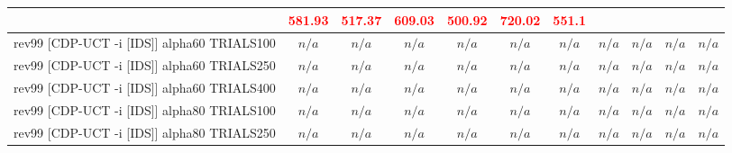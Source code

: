 \documentclass{article}
\begin{document}
\begin{tabular}{|l|r@{$\pm$}rr@{$\pm$}rr@{$\pm$}rr@{$\pm$}rr@{$\pm$}rr@{$\pm$}rr@{$\pm$}rr@{$\pm$}rr@{$\pm$}rr@{$\pm$}r|}
& \multicolumn{2}{c}{\textbf{\textcolor{red}{581.93}}}
& \multicolumn{2}{c}{\textbf{\textcolor{red}{517.37}}}
& \multicolumn{2}{c}{\textbf{\textcolor{red}{609.03}}}
& \multicolumn{2}{c}{\textbf{\textcolor{red}{500.92}}}
& \multicolumn{2}{c}{\textbf{\textcolor{red}{720.02}}}
& \multicolumn{2}{c|}{\textbf{\textcolor{red}{551.1}}}
\\
\hline
rev99 [CDP-UCT -i [IDS]] alpha60 TRIALS100
& \multicolumn{2}{c}{\textbf{$n/a$}}
& \multicolumn{2}{c}{\textbf{$n/a$}}
& \multicolumn{2}{c}{\textbf{$n/a$}}
& \multicolumn{2}{c}{\textbf{$n/a$}}
& \multicolumn{2}{c}{\textbf{$n/a$}}
& \multicolumn{2}{c}{\textbf{$n/a$}}
& \multicolumn{2}{c}{\textbf{$n/a$}}
& \multicolumn{2}{c}{\textbf{$n/a$}}
& \multicolumn{2}{c}{\textbf{$n/a$}}
& \multicolumn{2}{c|}{\textbf{$n/a$}}
\\
rev99 [CDP-UCT -i [IDS]] alpha60 TRIALS250
& \multicolumn{2}{c}{\textbf{$n/a$}}
& \multicolumn{2}{c}{\textbf{$n/a$}}
& \multicolumn{2}{c}{\textbf{$n/a$}}
& \multicolumn{2}{c}{\textbf{$n/a$}}
& \multicolumn{2}{c}{\textbf{$n/a$}}
& \multicolumn{2}{c}{\textbf{$n/a$}}
& \multicolumn{2}{c}{\textbf{$n/a$}}
& \multicolumn{2}{c}{\textbf{$n/a$}}
& \multicolumn{2}{c}{\textbf{$n/a$}}
& \multicolumn{2}{c|}{\textbf{$n/a$}}
\\
rev99 [CDP-UCT -i [IDS]] alpha60 TRIALS400
& \multicolumn{2}{c}{\textbf{$n/a$}}
& \multicolumn{2}{c}{\textbf{$n/a$}}
& \multicolumn{2}{c}{\textbf{$n/a$}}
& \multicolumn{2}{c}{\textbf{$n/a$}}
& \multicolumn{2}{c}{\textbf{$n/a$}}
& \multicolumn{2}{c}{\textbf{$n/a$}}
& \multicolumn{2}{c}{\textbf{$n/a$}}
& \multicolumn{2}{c}{\textbf{$n/a$}}
& \multicolumn{2}{c}{\textbf{$n/a$}}
& \multicolumn{2}{c|}{\textbf{$n/a$}}
\\
rev99 [CDP-UCT -i [IDS]] alpha80 TRIALS100
& \multicolumn{2}{c}{\textbf{$n/a$}}
& \multicolumn{2}{c}{\textbf{$n/a$}}
& \multicolumn{2}{c}{\textbf{$n/a$}}
& \multicolumn{2}{c}{\textbf{$n/a$}}
& \multicolumn{2}{c}{\textbf{$n/a$}}
& \multicolumn{2}{c}{\textbf{$n/a$}}
& \multicolumn{2}{c}{\textbf{$n/a$}}
& \multicolumn{2}{c}{\textbf{$n/a$}}
& \multicolumn{2}{c}{\textbf{$n/a$}}
& \multicolumn{2}{c|}{\textbf{$n/a$}}
\\
rev99 [CDP-UCT -i [IDS]] alpha80 TRIALS250
& \multicolumn{2}{c}{\textbf{$n/a$}}
& \multicolumn{2}{c}{\textbf{$n/a$}}
& \multicolumn{2}{c}{\textbf{$n/a$}}
& \multicolumn{2}{c}{\textbf{$n/a$}}
& \multicolumn{2}{c}{\textbf{$n/a$}}
& \multicolumn{2}{c}{\textbf{$n/a$}}
& \multicolumn{2}{c}{\textbf{$n/a$}}
& \multicolumn{2}{c}{\textbf{$n/a$}}
& \multicolumn{2}{c}{\textbf{$n/a$}}
& \multicolumn{2}{c|}{\textbf{$n/a$}}

\end{tabular}
\end{document}
